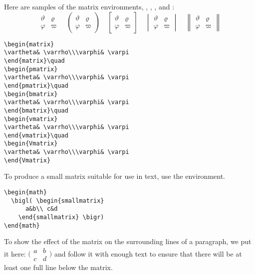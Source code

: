 Here are samples of the matrix environments,
, , ,  and :
\begin{equation}
\begin{matrix} 
\vartheta& \varrho\\\varphi& \varpi
\end{matrix}\quad
\begin{pmatrix} 
\vartheta& \varrho\\\varphi& \varpi
\end{pmatrix}\quad
\begin{bmatrix} 
\vartheta& \varrho\\\varphi& \varpi
\end{bmatrix}\quad
\begin{vmatrix} 
\vartheta& \varrho\\\varphi& \varpi
\end{vmatrix}\quad
\begin{Vmatrix} 
\vartheta& \varrho\\\varphi& \varpi
\end{Vmatrix}
\end{equation}
\begin{verbatim}
\begin{matrix} 
\vartheta& \varrho\\\varphi& \varpi
\end{matrix}\quad
\begin{pmatrix} 
\vartheta& \varrho\\\varphi& \varpi
\end{pmatrix}\quad
\begin{bmatrix} 
\vartheta& \varrho\\\varphi& \varpi
\end{bmatrix}\quad
\begin{vmatrix} 
\vartheta& \varrho\\\varphi& \varpi
\end{vmatrix}\quad
\begin{Vmatrix} 
\vartheta& \varrho\\\varphi& \varpi
\end{Vmatrix}
\end{verbatim}

To produce a small matrix suitable for use in text, use the
 environment.
\begin{verbatim}
\begin{math}
  \bigl( \begin{smallmatrix}
      a&b\\ c&d
    \end{smallmatrix} \bigr)
\end{math}
\end{verbatim}
To show 
the effect of the matrix on the surrounding lines of
a paragraph, we put it here: \begin{math}
  \bigl( \begin{smallmatrix}
      a&b\\ c&d
    \end{smallmatrix} \bigr)
\end{math}
and follow it with enough text to ensure that there will
be at least one full line below the matrix.

